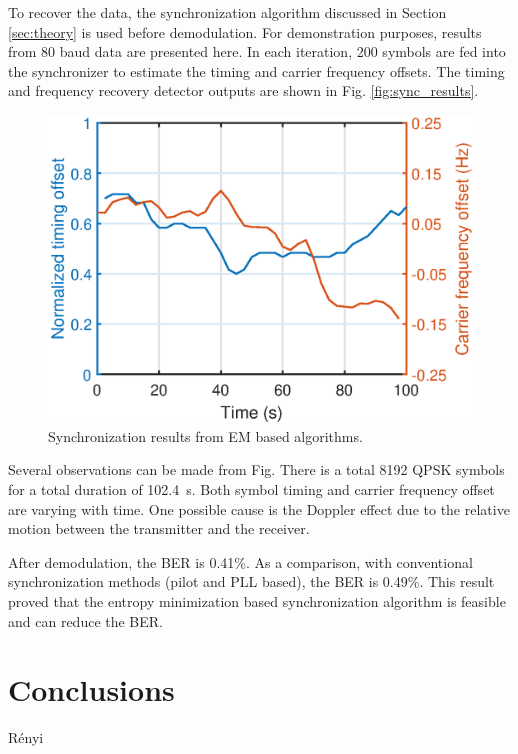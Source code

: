 \documentclass[journal,comsoc]{IEEEtran}
\begin{document}
To recover the data, the synchronization algorithm discussed in Section \ref{sec:theory} is used before demodulation.
For demonstration purposes, results from 80 baud data are presented here.
In each iteration, 200 symbols are fed into the synchronizer to estimate the timing and carrier frequency offsets. 
The timing and frequency recovery detector outputs are shown in Fig. \ref{fig:sync_results}.

\begin{figure}[ht]
\centering
\includegraphics[width=3 in]{pic/per_exp.eps}
\caption{Synchronization results from EM based algorithms.}
\label{fig:per_exp} 
\end{figure} 


Several observations can be made from Fig.
There is a total 8192 QPSK symbols for a total duration of 102.4~s.
Both symbol timing and carrier frequency offset are varying with time.
One possible cause is the Doppler effect due to the relative motion between the transmitter and the receiver.

After demodulation, the BER is 0.41\%.
As a comparison, with conventional synchronization methods (pilot and PLL based), the BER is 0.49\%.
This result proved that the entropy minimization based synchronization algorithm is feasible and can reduce the BER.



\section{Conclusions}
\label{sec:conc}
R\'enyi
\small


\end{document}
